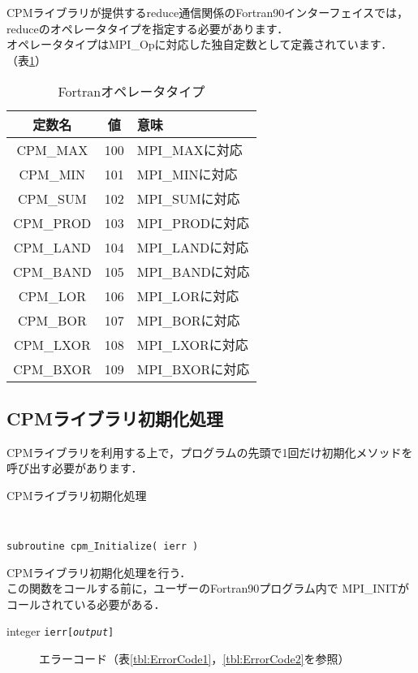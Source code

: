 \begin{itemize}
CPMライブラリが提供するreduce通信関係のFortran90インターフェイスでは，
reduceのオペレータタイプを指定する必要があります．\\
オペレータタイプはMPI\_Opに対応した独自定数として定義されています．
（表\ref{tbl:opF}）\\

\begin{table}[htb]
\begin{center}
\caption{Fortranオペレータタイプ}
\label{tbl:opF}
\begin{tabular}{|c|c|l|}
\hline 
定数名 & 値 & 意味\\
\hline
CPM\_MAX  & 100 & MPI\_MAXに対応 \\
CPM\_MIN  & 101 & MPI\_MINに対応 \\
CPM\_SUM  & 102 & MPI\_SUMに対応 \\
CPM\_PROD & 103 & MPI\_PRODに対応 \\
CPM\_LAND & 104 & MPI\_LANDに対応 \\
CPM\_BAND & 105 & MPI\_BANDに対応 \\
CPM\_LOR  & 106 & MPI\_LORに対応 \\
CPM\_BOR  & 107 & MPI\_BORに対応 \\
CPM\_LXOR & 108 & MPI\_LXORに対応 \\
CPM\_BXOR & 109 & MPI\_BXORに対応 \\
\hline
\end{tabular}
\end{center}
\end{table}
\end{itemize}


\clearpage


\subsection{CPMライブラリ初期化処理}
\label{CPMinitF}

CPMライブラリを利用する上で，プログラムの先頭で1回だけ初期化メソッドを
呼び出す必要があります．

\begin{spacing}{0.8}
\begin{itembox}[l]{CPMライブラリ初期化処理}
{\tt
\begin{verbatim}
subroutine cpm_Initialize( ierr )
\end{verbatim}
}
CPMライブラリ初期化処理を行う．\\
この関数をコールする前に，ユーザーのFortran90プログラム内で
MPI\_INITがコールされている必要がある．
\begin{description}
\item[integer {\tt ierr[{\it output}]}] エラーコード（表\ref{tbl:ErrorCode1}，\ref{tbl:ErrorCode2}を参照）
\end{description}
\end{itembox}\\
\end{spacing}


